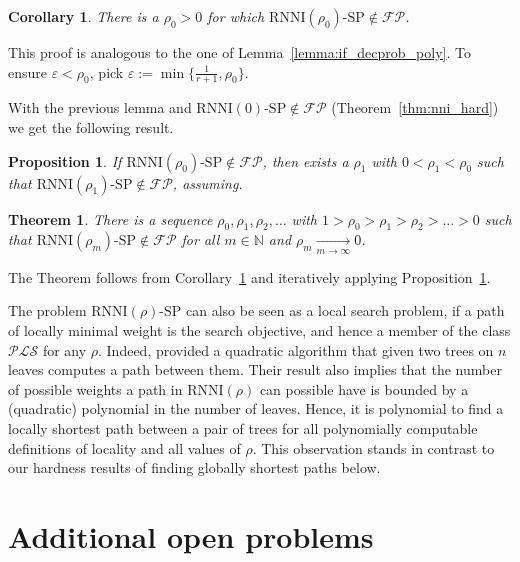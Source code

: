 \documentclass[11pt]{amsart}
\newtheorem{proposition}{Proposition}
\newtheorem{theorem}{Theorem}
\newtheorem{corollary}{Corollary}
\newcommand{\rnni}{\mathrm{RNNI}}
\newcommand{\pls}{\mathcal{PLS}}
\newcommand{\fpc}{\mathcal{FP}}
\newcommand{\decprob}[1]{\rnni(#1)\text{-}\mathrm{SP}}
\renewcommand{\epsilon}{\varepsilon}
\begin{document}
\begin{corollary}
There is a $\rho_0 > 0$ for which $\decprob{\rho_0} \notin \fpc$.
\label{cor:exists_rho_not_poly}
\end{corollary}

\proof
This proof is analogous to the one of Lemma~\ref{lemma:if_decprob_poly}.
To ensure $\epsilon < \rho_0$, pick $\epsilon := \min\{\frac{1}{r + 1}, \rho_0\}$.
\endproof

With the previous lemma and $\decprob{0} \notin \fpc$ (Theorem~\ref{thm:nni_hard}) we get the following result.

\begin{proposition}
If $\decprob{\rho_0} \notin \fpc$, then exists a $\rho_1$ with $0 < \rho_1 < \rho_0$ such that $\decprob{\rho_1} \notin \fpc$, assuming.
\label{proposition:more_rho_not_poly}
\end{proposition}

\begin{theorem}
There is a sequence $\rho_0, \rho_1, \rho_2, \ldots$ with $1 > \rho_0 > \rho_1 > \rho_2 > \ldots > 0$ such that $\decprob{\rho_m} \notin \fpc$ for all $m \in \mathbb N$ and $\rho_m \underset{m \rightarrow \infty}{\longrightarrow} 0$.
\end{theorem}

\proof
The Theorem follows from Corollary~\ref{cor:exists_rho_not_poly} and iteratively applying Proposition~\ref{proposition:more_rho_not_poly}.
\endproof

The problem $\decprob{\rho}$ can also be seen as a local search problem, if a path of locally minimal weight is the search objective, and hence a member of the class $\pls$ for any $\rho$.
Indeed, \textcite{Gavryushkin2018-ol} provided a quadratic algorithm that given two trees on $n$ leaves computes a path between them.
Their result also implies that the number of possible weights a path in $\rnni(\rho)$ can possible have is bounded by a (quadratic) polynomial in the number of leaves.
Hence, it is polynomial to find a locally shortest path between a pair of trees for all polynomially computable definitions of locality and all values of $\rho$.
This observation stands in contrast to our hardness results of finding globally shortest paths below.

\section{Additional open problems}
\end{document}
